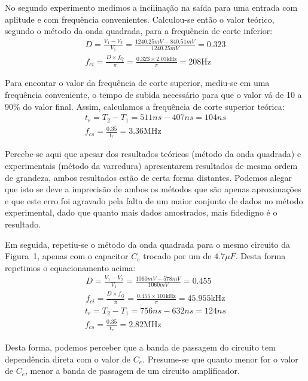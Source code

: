 \documentclass[12pt,a4paper]{article}
\begin{document}
No segundo experimento medimos a incilinação na saída para 
uma entrada com aplitude e com frequência convenientes. 
Calculou-se então o valor teórico, segundo o método da onda quadrada,
para a frequência de corte inferior:
\begin{align}
  D= \frac{V_1- V_2}{V_1}  = \frac{1240.25mV - 840.51mV}{1240.25mV} = 0.323 \\
  f_{ci}= \frac{D \times f_{Q}}{\pi}= \frac{0.323 \times 2.03 \text{kHz}}{\pi}=208 \text{Hz}
\end{align}

Para encontar o valor da frequência de corte superior, mediu-se  em uma frequência 
conveniente, o tempo de subida necessário para que o valor vá de 10 a 90\% 
do valor final. Assim, calculamos a frequência de corte superior teórica:
\begin{align}
  t_{r} = T_2 - T_1 = 511ns - 407ns =104ns\\
  f_{cs}= \frac{0.35}{t_r}= 3.36 \text{MHz}
\end{align}

Percebe-se aqui que apesar dos resultados teóricos (método da onda quadrada) e 
experimentais (método da varredura) apresentarem resultados de mesma ordem de grandeza,
ambos resultados estão de certa forma distantes. Podemos alegar que isto se deve 
a imprecisão de ambos os métodos que são apenas aproximações e que este erro 
foi agravado pela falta de um maior conjunto de dados no método experimental, dado 
que quanto mais dados amostrados, mais fidedigno é o resultado.

Em seguida, repetiu-se o método da onda quadrada para o mesmo circuito da Figura~1,
apenas com o capacitor $C_{e}$ trocado por um de $4.7\mu F$. Desta forma repetimos 
o equacionamento acima:
\begin{align}
  D= \frac{V_1- V_2}{V_1}  = \frac{1060 mV- 578mV }{1060 mV} = 0.455 \\
  f_{ci}= \frac{D \times f_{Q}}{\pi}= \frac{0.455 \times 101 \text{kHz}}{\pi}=45.955\text{kHz}
\end{align}
\begin{align}
  t_{r} = T_2 - T_1 = 756ns- 632ns=124ns \\
  f_{cs}= \frac{0.35}{t_r}= 2.82 \text{MHz}
\end{align}

Desta forma, podemos perceber que a banda de passagem do circuito tem dependência 
direta com o valor de $C_e$. Presume-se que quanto menor for o valor de $C_{e}$, 
menor a banda de passagem de um circuito amplificador.
\newpage
\end{document}
